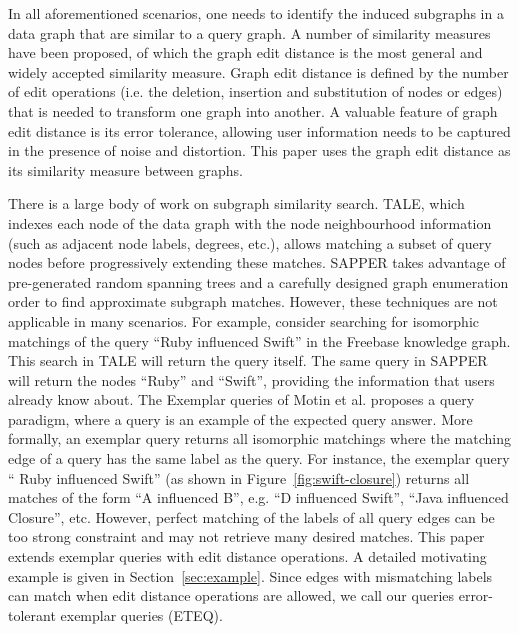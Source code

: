 \documentclass{sigmod}
\begin{document}
In all aforementioned scenarios, one needs to identify the induced subgraphs in a data graph that are similar to a query graph. A number of similarity measures have been proposed\cite{fernandez2001graph,bunke1998graph,raymond2002rascal}, of which the graph edit distance\cite{gao2010survey} is  the most general and widely accepted similarity measure. Graph edit distance is defined by the number of edit operations (i.e. the deletion, insertion and substitution of nodes or edges) that is needed to transform one graph into another. A valuable feature of graph edit distance is its error tolerance, allowing user information needs to be captured in the presence of noise and distortion. This paper uses the graph edit distance  as its similarity measure between graphs.

There is a large body of work on subgraph similarity search. TALE\cite{tian2008tale}, which indexes each node of the data graph with the node neighbourhood information (such as adjacent node labels, degrees, etc.), allows matching a subset of query nodes before progressively extending these matches. SAPPER\cite{zhang2010sapper} takes advantage of pre-generated random spanning trees and a carefully designed graph enumeration order to find approximate subgraph matches. 
However, these techniques are not applicable in many scenarios. 
For example, consider searching for isomorphic matchings of the query ``Ruby influenced Swift'' in the Freebase knowledge graph\cite{bollacker2008freebase}. This search in TALE will return the query itself. The same query in SAPPER will return the nodes ``Ruby'' and ``Swift'', providing the information that users already know about.
The Exemplar queries of  Motin et al.\cite{mottin2014exemplar} proposes a query paradigm, where a query is an example of the expected query answer. More formally, an exemplar query returns all isomorphic matchings where the matching edge of a query has the same label as the query. For instance, the exemplar query `` Ruby influenced Swift'' (as shown in Figure~\ref{fig:swift-closure}) returns all matches of the form ``A influenced B'', e.g. ``D influenced Swift'', ``Java influenced Closure'', etc. However, perfect matching of the labels of all query edges can be too strong constraint and may not retrieve many desired matches. This paper extends exemplar queries with edit distance operations.
A detailed motivating example is given in Section~\ref{sec:example}. 
Since edges with mismatching labels can match when edit distance operations are allowed, we call our queries error-tolerant exemplar queries (ETEQ). 
\end{document}
